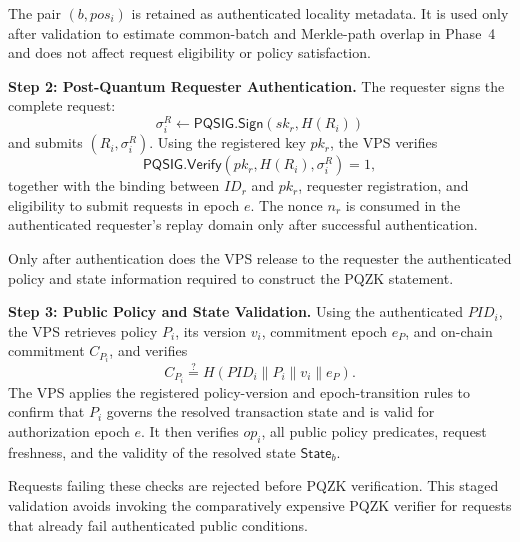 \documentclass[lettersize,journal]{IEEEtran}
\begin{document}
The pair $(b,pos_i)$ is retained as authenticated locality metadata.
It is used only after validation to estimate common-batch and
Merkle-path overlap in Phase~4 and does not affect request eligibility
or policy satisfaction.

\medskip
\noindent\textbf{Step 2: Post-Quantum Requester Authentication.}
The requester signs the complete request:
\begin{equation}
\sigma_i^R\leftarrow
\mathsf{PQSIG.Sign}(sk_r,H(R_i))
\end{equation}
and submits $(R_i,\sigma_i^R)$. Using the registered key $pk_r$, the
VPS verifies
\begin{equation}
\mathsf{PQSIG.Verify}
(pk_r,H(R_i),\sigma_i^R)=1,
\end{equation}
together with the binding between $ID_r$ and $pk_r$, requester
registration, and eligibility to submit requests in epoch $e$.
The nonce $n_r$ is consumed in the authenticated requester's replay
domain only after successful authentication.

Only after authentication does the VPS release to the requester the
authenticated policy and state information required to construct the
PQZK statement.

\medskip
\noindent\textbf{Step 3: Public Policy and State Validation.}
Using the authenticated $PID_i$, the VPS retrieves policy $P_i$, its
version $v_i$, commitment epoch $e_P$, and on-chain commitment
$C_{P_i}$, and verifies
\begin{equation}
C_{P_i}
\stackrel{?}{=}
H(PID_i\parallel P_i\parallel v_i\parallel e_P).
\end{equation}
The VPS applies the registered policy-version and epoch-transition rules
to confirm that $P_i$ governs the resolved transaction state and is
valid for authorization epoch $e$. It then verifies $op_i$, all public
policy predicates, request freshness, and the validity of the resolved
state $\mathsf{State}_b$.

Requests failing these checks are rejected before PQZK verification.
This staged validation avoids invoking the comparatively expensive
PQZK verifier for requests that already fail authenticated public
conditions.
\end{document}

